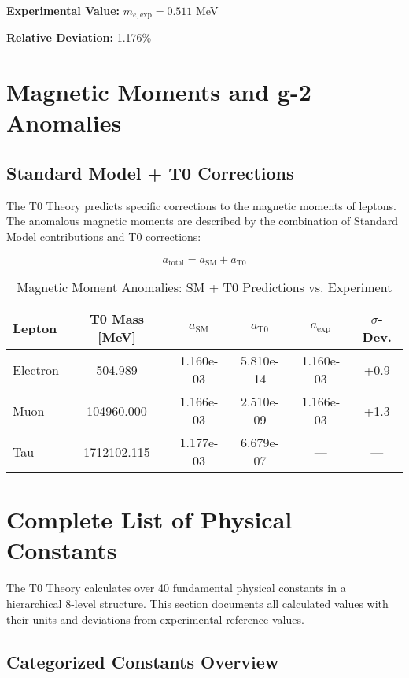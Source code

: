 \documentclass[11pt,a4paper]{article}
\begin{document}
	\textbf{Experimental Value:} $m_{e,\text{exp}} = 0.511$ MeV
	
	\textbf{Relative Deviation:} 1.176\%
	
	\section{Magnetic Moments and g-2 Anomalies}
	
	\subsection{Standard Model + T0 Corrections}
	
	The T0 Theory predicts specific corrections to the magnetic moments of leptons. The anomalous magnetic moments are described by the combination of Standard Model contributions and T0 corrections:
	
	\begin{equation}
		a_{\text{total}} = a_{\text{SM}} + a_{\text{T0}}
	\end{equation}
	
	\begin{table}[h]
		\centering
		\begin{tabular}{>{\raggedright}p{4cm}ccccc}
			\toprule
			\textbf{Lepton} & \textbf{T0 Mass [MeV]} & \textbf{$a_{\text{SM}}$} & \textbf{$a_{\text{T0}}$} & \textbf{$a_{\text{exp}}$} & \textbf{$\sigma$-Dev.} \\
			\midrule
			Electron & 504.989 & 1.160e-03 & 5.810e-14 & 1.160e-03 & +0.9 \\
			Muon & 104960.000 & 1.166e-03 & 2.510e-09 & 1.166e-03 & +1.3 \\
			Tau & 1712102.115 & 1.177e-03 & 6.679e-07 & --- & --- \\
			\bottomrule
		\end{tabular}
		\caption{Magnetic Moment Anomalies: SM + T0 Predictions vs. Experiment}
	\end{table}
	
	\section{Complete List of Physical Constants}
	
	The T0 Theory calculates over 40 fundamental physical constants in a hierarchical 8-level structure. This section documents all calculated values with their units and deviations from experimental reference values.
	
	\subsection{Categorized Constants Overview}
	
\end{document}

